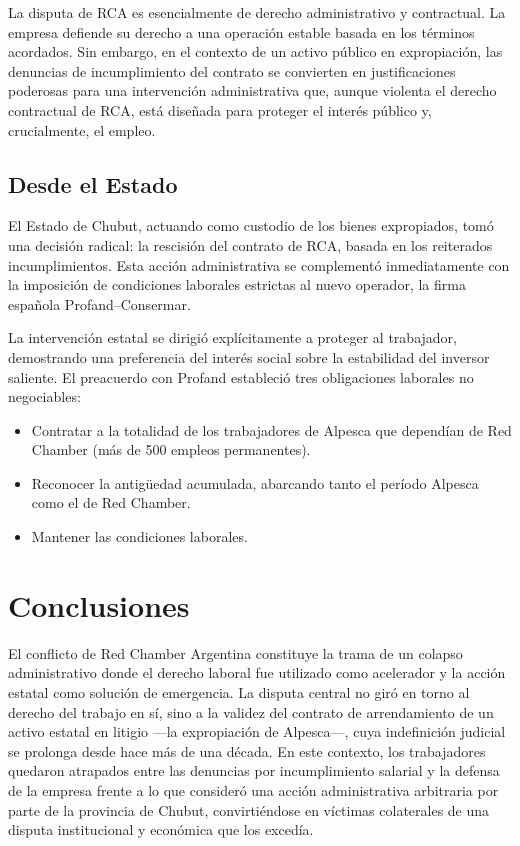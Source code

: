 \documentclass[]{informeutn}
\begin{document}
      La disputa de RCA es esencialmente de derecho administrativo y contractual. La empresa defiende su derecho a una
      operación estable basada en los términos acordados. Sin embargo, en el contexto de un activo público en
      expropiación, las denuncias de incumplimiento del contrato se convierten en justificaciones poderosas para una
      intervención administrativa que, aunque violenta el derecho contractual de RCA, está diseñada para proteger el
      interés público y, crucialmente, el empleo.

    \section{Desde el Estado}
      El Estado de Chubut, actuando como custodio de los bienes expropiados, tomó una decisión radical: la rescisión del
      contrato de RCA, basada en los reiterados incumplimientos. Esta acción administrativa se complementó
      inmediatamente con la imposición de condiciones laborales estrictas al nuevo operador, la firma española
      Profand–Consermar.

      La intervención estatal se dirigió explícitamente a proteger al trabajador, demostrando una preferencia del
      interés social sobre la estabilidad del inversor saliente. El preacuerdo con Profand estableció tres obligaciones
      laborales no negociables:
      \begin{itemize}
        \item Contratar a la totalidad de los trabajadores de Alpesca que dependían de Red Chamber (más de 500 empleos permanentes).
        \item Reconocer la antigüedad acumulada, abarcando tanto el período Alpesca como el de Red Chamber.
        \item Mantener las condiciones laborales.
      \end{itemize}

  \chapter{Conclusiones}
    El conflicto de Red Chamber Argentina constituye la trama de un colapso administrativo donde el derecho laboral
    fue utilizado como acelerador y la acción estatal como solución de emergencia. La disputa central no giró en torno
    al derecho del trabajo en sí, sino a la validez del contrato de arrendamiento de un activo estatal en litigio —la
    expropiación de Alpesca—, cuya indefinición judicial se prolonga desde hace más de una década. En este contexto, los
    trabajadores quedaron atrapados entre las denuncias por incumplimiento salarial y la defensa de la empresa frente a
    lo que consideró una acción administrativa arbitraria por parte de la provincia de Chubut, convirtiéndose en
    víctimas colaterales de una disputa institucional y económica que los excedía.
\end{document}
